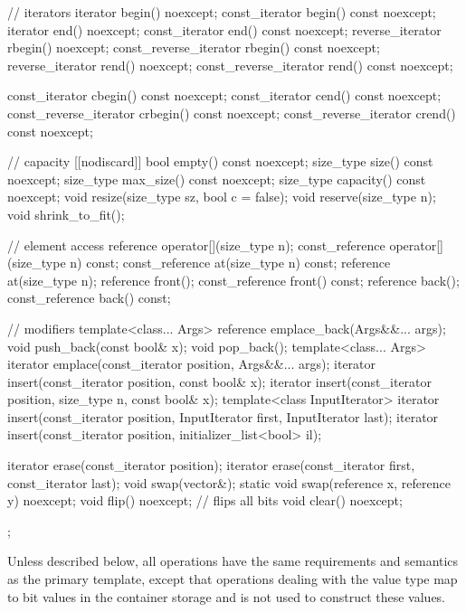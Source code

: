 \begin{codeblock}
{{    // iterators
    iterator               begin() noexcept;
    const_iterator         begin() const noexcept;
    iterator               end() noexcept;
    const_iterator         end() const noexcept;
    reverse_iterator       rbegin() noexcept;
    const_reverse_iterator rbegin() const noexcept;
    reverse_iterator       rend() noexcept;
    const_reverse_iterator rend() const noexcept;

    const_iterator         cbegin() const noexcept;
    const_iterator         cend() const noexcept;
    const_reverse_iterator crbegin() const noexcept;
    const_reverse_iterator crend() const noexcept;

    // capacity
    [[nodiscard]] bool empty() const noexcept;
    size_type size() const noexcept;
    size_type max_size() const noexcept;
    size_type capacity() const noexcept;
    void      resize(size_type sz, bool c = false);
    void      reserve(size_type n);
    void      shrink_to_fit();

    // element access
    reference       operator[](size_type n);
    const_reference operator[](size_type n) const;
    const_reference at(size_type n) const;
    reference       at(size_type n);
    reference       front();
    const_reference front() const;
    reference       back();
    const_reference back() const;

    // modifiers
    template<class... Args> reference emplace_back(Args&&... args);
    void push_back(const bool& x);
    void pop_back();
    template<class... Args> iterator emplace(const_iterator position, Args&&... args);
    iterator insert(const_iterator position, const bool& x);
    iterator insert(const_iterator position, size_type n, const bool& x);
    template<class InputIterator>
      iterator insert(const_iterator position, InputIterator first, InputIterator last);
    iterator insert(const_iterator position, initializer_list<bool> il);

    iterator erase(const_iterator position);
    iterator erase(const_iterator first, const_iterator last);
    void swap(vector&);
    static void swap(reference x, reference y) noexcept;
    void flip() noexcept;       // flips all bits
    void clear() noexcept;
  };
}
\end{codeblock}%

\pnum
Unless described below, all operations have the same requirements and
semantics as the primary  template, except that operations
dealing with the  value type map to bit values in the
container storage and
is not used to construct these values.


